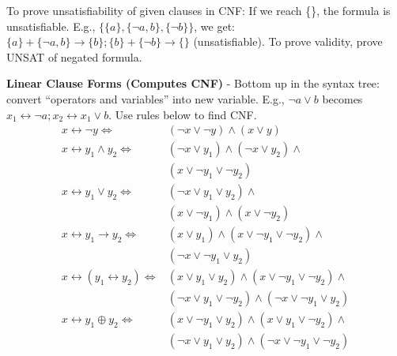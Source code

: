 \documentclass{article}
\begin{document}
\begin{multicols}{4}
To prove unsatisfiability of given clauses in CNF: If we reach \{\}, the formula is unsatisfiable. 
E.g., $\{\{a\}, \{\neg a,b\}, \{\neg b\}\}$, we get: $\{a\} + \{ \neg a,b\} \rightarrow \{b\}; \{b\} + \{\neg b\}\rightarrow\{\} $ (unsatisfiable).
To prove validity, prove UNSAT of negated formula.

\textbf{Linear Clause Forms (Computes CNF)} - Bottom up in the syntax tree: convert “operators and variables” into new variable.
E.g., $\neg a \vee b$ becomes $x_1 \leftrightarrow \neg a; x_2 \leftrightarrow x_1 \vee b$. Use rules below to find CNF.
\begin{align*}
x \leftrightarrow \neg y  \Leftrightarrow &(\neg x \vee \neg y) \wedge (x \vee y) \\
x \leftrightarrow y_1 \wedge y_2 \Leftrightarrow &(\neg x \vee y_1) \wedge (\neg x \vee y_2) \wedge\\
&(x \vee \neg y_1 \vee \neg y_2) \\
x \leftrightarrow y_1 \vee y_2 \Leftrightarrow & (\neg x \vee y_1 \vee y_2) \wedge \\
&( x \vee \neg y_1) \wedge (x \vee \neg y_2) \\
x \leftrightarrow y_1 \rightarrow y_2 \Leftrightarrow & (x \vee y_1) \wedge ( x \vee \neg y_1 \vee \neg y_2) \wedge \\
&(\neg x \vee \neg y_1 \vee y_2) \\
x \leftrightarrow (y_1 \leftrightarrow y_2) \Leftrightarrow & (x \vee y_1 \vee y_2) \wedge (x \vee \neg y_1 \vee \neg y_2) \wedge \\
&(\neg x \vee y_1 \vee \neg y_2) \wedge (\neg x \vee \neg y_1 \vee y_2)\\
x \leftrightarrow y_1 \oplus y_2 \Leftrightarrow & (x \vee \neg y_1 \vee y_2) \wedge (x \vee y_1 \vee \neg y_2) \wedge \\ &(\neg x \vee y_1 \vee y_2) \wedge (\neg x \vee \neg y_1 \vee \neg y_2)
\end{align*}


\end{multicols}
\end{document}
